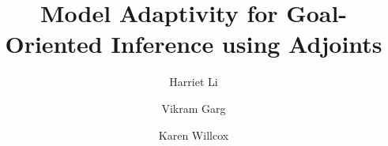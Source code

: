 \documentclass[review,sort&compress]{elsarticle}
\theoremstyle{plain} %
\theoremstyle{definition} %
\begin{document}

\begin{frontmatter}

\title{Model Adaptivity for Goal-Oriented Inference using Adjoints}


\author[adr1]{Harriet Li}
\address[adr1]{Department of Aeronautics and Astronautics, Massachusetts Institute of Technology, Cambridge, MA, 02139, USA; \texttt{hli@alum.mit.edu}}
\author[adr2]{Vikram Garg}
\address[adr2]{Institute for Computational Engineering and Sciences, University of Texas, Austin, TX, 78712, USA; \texttt{vikram.v.garg@gmail.com}}
\author[adr3]{Karen Willcox}
\address[adr3]{Department of Aeronautics and Astronautics, Massachusetts Institute of Technology, Cambridge, MA, 02139, USA; \texttt{kwillcox@mit.edu}}


\end{frontmatter}
\end{document}

